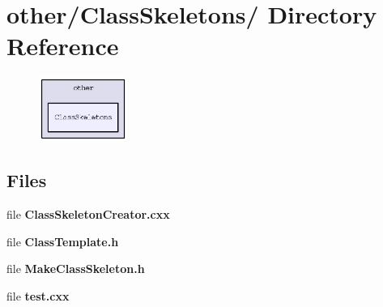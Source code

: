 \section{other/Class\-Skeletons/ Directory Reference}
\label{dir_f209889cfb7a0adbb1ddd566d3a68119}


\begin{figure}[H]
\begin{center}
\leavevmode
\includegraphics[width=82pt]{dir_f209889cfb7a0adbb1ddd566d3a68119_dep}
\end{center}
\end{figure}
\subsection*{Files}
\begin{CompactItemize}
\item 
file \textbf{Class\-Skeleton\-Creator.cxx}
\item 
file \textbf{Class\-Template.h}
\item 
file \textbf{Make\-Class\-Skeleton.h}
\item 
file \textbf{test.cxx}
\end{CompactItemize}
